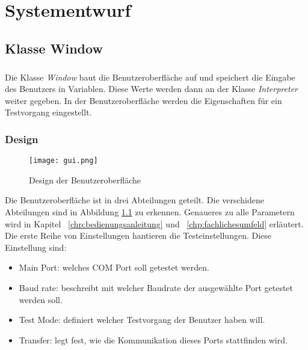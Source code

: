 \chapter{Systementwurf}\label{chp:systementwurf}

\section{Klasse Window}
\paragraph{}
Die Klasse \textit{Window} baut die Benutzeroberfläche auf und speichert die Eingabe des Benutzers in Variablen. Diese Werte werden dann an der Klasse \textit{Interpreter} weiter gegeben. In der Benutzeroberfläche werden die Eigenschaften für ein Testvorgang eingestellt.


\subsection{Design}
\begin{figure}[h]
  \begin{center}		%
    \texttt{[image: gui.png]}
  		  \caption{Design der Benutzeroberfläche}
     \label{GUI_Bild}
  \end{center}
\end{figure}


Die Benutzeroberfläche ist in drei Abteilungen geteilt. Die verschidene Abteilungen sind in Abbildung \ref{GUI_Bild} zu erkennen. Genaueres zu alle Parametern wird in Kapitel ~\ref{chp:bedienungsanleitung} und  ~\ref{chp:fachlichesumfeld} erläutert. Die erste Reihe von Einstellungen hantieren die Testeinstellungen. Diese Einstellung sind:
\begin{itemize}
\item Main Port: welches COM Port soll getestet werden.
\item Baud rate: beschreibt mit welcher Baudrate der ausgewählte Port getestet werden soll.
\item Test Mode: definiert welcher Testvorgang der Benutzer haben will.
\item Transfer: legt fest, wie die Kommunikation dieses Ports stattfinden wird.
\end{itemize}


